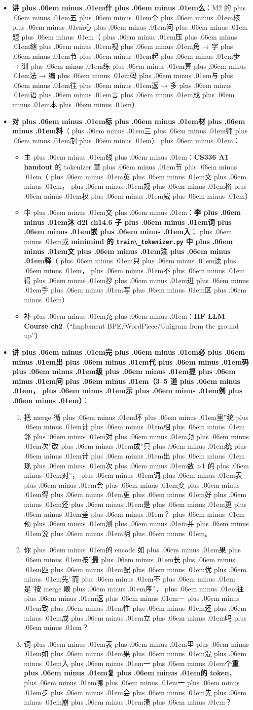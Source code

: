 \documentclass[
]{article}
\newcommand{\passthrough}[1]{#1}
\providecommand{\tightlist}{%
  \setlength{\itemsep}{0pt}\setlength{\parskip}{0pt}}
\def\zh#1{{\zhfont #1}}
\def\sym#1{{\symfont #1}}
\def\zhglue{\hskip0pt plus .06em minus .01em}
\begin{document}
\begin{itemize}
\tightlist
\item
  \textbf{\zh{讲\zhglue 什\zhglue 么}}\zh{：}M2 \zh{的\zhglue 五\zhglue 个\zhglue 核\zhglue 心\zhglue 问\zhglue 题\zhglue （\zhglue 压\zhglue 缩\zhglue 视\zhglue 角} \sym{→} \zh{字\zhglue 节\zhglue 起\zhglue 步} \sym{→} \zh{训\zhglue 练\zhglue 算\zhglue 法} \sym{→} \zh{编\zhglue 码\zhglue 与\zhglue 往\zhglue 返} \sym{→} \zh{多\zhglue 语\zhglue 言\zhglue 成\zhglue 本\zhglue ）}
\item
  \textbf{\zh{对\zhglue 标\zhglue 材\zhglue 料}}\zh{（\zhglue 三\zhglue 师\zhglue 制\zhglue ）\zhglue ：}

  \begin{itemize}
  \tightlist
  \item
    \zh{主\zhglue 线\zhglue ：}\textbf{CS336 A1 handout} \zh{的} tokenizer \zh{章\zhglue 节\zhglue （\zhglue 英\zhglue 文\zhglue ，\zhglue 规\zhglue 格\zhglue 权\zhglue 威\zhglue ）}
  \item
    \zh{中\zhglue 文\zhglue ：}\textbf{\zh{李\zhglue 沐} d2l ch14.6 \zh{子\zhglue 词\zhglue 嵌\zhglue 入}}\zh{；\zhglue 或} \textbf{minimind \zh{的} \passthrough{\lstinline!train\_tokenizer.py!} \zh{中\zhglue 文\zhglue 注\zhglue 释}}\zh{（\zhglue 只\zhglue 读\zhglue ，\zhglue 不\zhglue 得\zhglue 抄\zhglue 进\zhglue 手\zhglue 写\zhglue 区\zhglue ）}
  \item
    \zh{补\zhglue 充\zhglue ：}\textbf{HF LLM Course ch2}\zh{（}``Implement BPE/WordPiece/Unigram from the ground up''\zh{）}
  \end{itemize}
\item
  \textbf{\zh{讲\zhglue 完\zhglue 必\zhglue 出\zhglue 代\zhglue 码\zhglue 级\zhglue 提\zhglue 问\zhglue （}3--5 \zh{道\zhglue ，\zhglue 示\zhglue 例\zhglue ）}}\zh{：}

  \begin{enumerate}
  \def\labelenumi{\arabic{enumi}.}
  \tightlist
  \item
    \zh{把} merge \zh{循\zhglue 环\zhglue 里}''\zh{统\zhglue 计\zhglue 相\zhglue 邻\zhglue 对\zhglue 频\zhglue 次}''\zh{改\zhglue 成}''\zh{只\zhglue 统\zhglue 计\zhglue 出\zhglue 现\zhglue 次\zhglue 数} \textgreater1 \zh{的\zhglue 对}''\zh{，\zhglue 词\zhglue 表\zhglue 会\zhglue 变\zhglue 得\zhglue 更\zhglue 好\zhglue 还\zhglue 是\zhglue 更\zhglue 差\zhglue ？\zhglue 预\zhglue 测\zhglue 并\zhglue 说\zhglue 明\zhglue 。}
  \item
    \zh{你\zhglue 的} encode \zh{如\zhglue 果\zhglue 按}''\zh{最\zhglue 长\zhglue 匹\zhglue 配\zhglue 优\zhglue 先}''\zh{而\zhglue 不\zhglue 是}''\zh{按} merge \zh{顺\zhglue 序}''\zh{，\zhglue 往\zhglue 返\zhglue 一\zhglue 致\zhglue 性\zhglue 还\zhglue 成\zhglue 立\zhglue 吗\zhglue ？}
  \item
    \zh{词\zhglue 表\zhglue 里\zhglue 如\zhglue 果\zhglue 混\zhglue 入\zhglue 一\zhglue 个}\textbf{\zh{重\zhglue 复\zhglue 的} token}\zh{，\zhglue 哪\zhglue 一\zhglue 步\zhglue 会\zhglue 先\zhglue 崩\zhglue 溃\zhglue ？}
  \end{enumerate}
\end{itemize}
\end{document}
